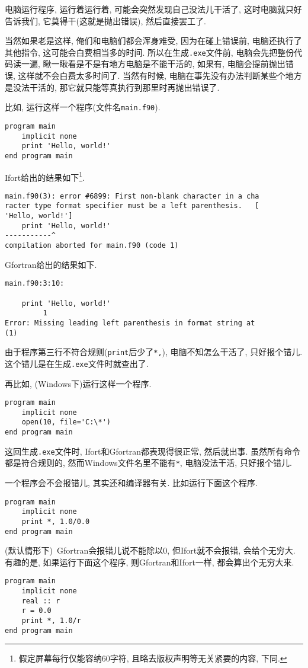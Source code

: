 电脑运行程序, 运行着运行着, 可能会突然发现自己没法儿干活了, 这时电脑就只好告诉我们, 它莫得干(这就是抛出错误), 然后直接罢工了.

当然如果老是这样, 俺们和电脑们都会浑身难受, 因为在碰上错误前, 电脑还执行了其他指令, 这可能会白费相当多的时间. 所以在生成\verb|.exe|文件前, 电脑会先把整份代码读一遍, 瞅一瞅看是不是有地方电脑是不能干活的, 如果有, 电脑会提前抛出错误, 这样就不会白费太多时间了. 当然有时候, 电脑在事先没有办法判断某些个地方是没法干活的, 那它就只能等真执行到那里时再抛出错误了.

比如, 运行这样一个程序(文件名\verb|main.f90|).
\begin{verbatim}
program main
    implicit none
    print 'Hello, world!'
end program main
\end{verbatim}

Ifort给出的结果如下\footnote{
    假定屏幕每行仅能容纳60字符, 且略去版权声明等无关紧要的内容, 下同.
}.
\begin{verbatim}
main.f90(3): error #6899: First non-blank character in a cha
racter type format specifier must be a left parenthesis.   [
'Hello, world!']
    print 'Hello, world!'
-----------^
compilation aborted for main.f90 (code 1)
\end{verbatim}

Gfortran给出的结果如下.
\begin{verbatim}
main.f90:3:10:

    print 'Hello, world!'
         1
Error: Missing leading left parenthesis in format string at 
(1)
\end{verbatim}

由于程序第三行不符合规则(\verb|print|后少了\verb|*,|), 电脑不知怎么干活了, 只好报个错儿. 这个错儿是在生成\verb|.exe|文件时就查出了.

再比如, (Windows下)运行这样一个程序.
\begin{verbatim}
program main
    implicit none
    open(10, file='C:\*')
end program main
\end{verbatim}

这回生成\verb|.exe|文件时, Ifort和Gfortran都表现得很正常, 然后就出事. 虽然所有命令都是符合规则的, 然而Windows文件名里不能有\verb|*|, 电脑没法干活, 只好报个错儿.

一个程序会不会报错儿, 其实还和编译器有关. 比如运行下面这个程序.
\begin{verbatim}
program main
    implicit none
    print *, 1.0/0.0
end program main
\end{verbatim}
(默认情形下)~Gfortran会报错儿说不能除以0, 但Ifort就不会报错, 会给个无穷大. 有趣的是, 如果运行下面这个程序, 则Gfortran和Ifort一样, 都会算出个无穷大来.
\begin{verbatim}
program main
    implicit none
    real :: r
    r = 0.0
    print *, 1.0/r
end program main
\end{verbatim}

